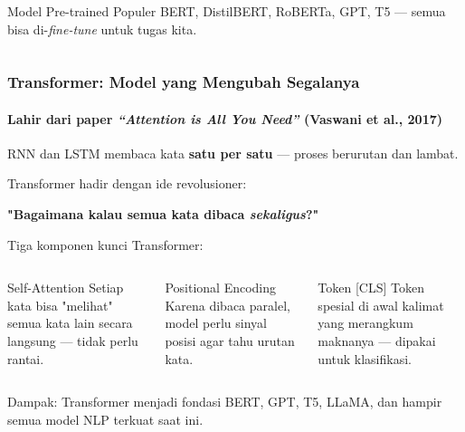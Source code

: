 \documentclass[t,aspectratio=169,xcolor=dvipsnames]{beamer}
\begin{document}
\begin{frame}
\begin{columns}[T]
        \begin{exampleblock}{Model Pre-trained Populer}
            \footnotesize
            BERT, DistilBERT, RoBERTa, GPT, T5 — semua bisa di-\textit{fine-tune} untuk tugas kita.
        \end{exampleblock}
    \end{columns}
\end{frame}

\begin{frame}
    \frametitle{Transformer: Model yang Mengubah Segalanya}
    \framesubtitle{Lahir dari paper \textit{``Attention is All You Need''} (Vaswani et al., 2017)}
    \small
    RNN dan LSTM membaca kata \textbf{satu per satu} — proses berurutan dan lambat.

    \vspace{0.3em}
    Transformer hadir dengan ide revolusioner:
    \begin{center}
        \textcolor{nyupurple}{\large\textbf{"Bagaimana kalau semua kata dibaca \textit{sekaligus}?"}}
    \end{center}

    \vspace{0.2em}
    Tiga komponen kunci Transformer:

    \vspace{0.2em}
    \begin{columns}[T]
        \begin{block}{\small Self-Attention}
            \footnotesize Setiap kata bisa "melihat" semua kata lain secara langsung — tidak perlu rantai.
        \end{block}

        \begin{exampleblock}{\small Positional Encoding}
            \footnotesize Karena dibaca paralel, model perlu sinyal posisi agar tahu urutan kata.
        \end{exampleblock}

        \begin{alertblock}{\small Token {[CLS]}}
            \footnotesize Token spesial di awal kalimat yang merangkum maknanya — dipakai untuk klasifikasi.
        \end{alertblock}
    \end{columns}

    \vspace{0.35em}
    \footnotesize
    \textcolor{nyubluedarker}{Dampak: Transformer menjadi fondasi BERT, GPT, T5, LLaMA, dan hampir semua model NLP terkuat saat ini.}
\end{frame}
\end{document}
